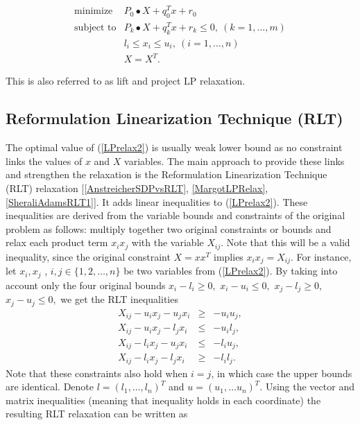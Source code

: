 \documentclass[12pt]{book}
\theoremstyle{definition}
\begin{document}
\begin{equation}
\label{LPrelax2} 
\begin{array}{ll}
\mbox{minimize}& P_0\bullet X + q_0^Tx + r_0\\
\mbox{subject to}& P_k\bullet X+ q_k^Tx + r_k \leq 0, \  (k = 1,\dots ,m)\\
 				& l_i\leq x_i \leq u_i, \ (i = 1,\dots ,n)\\
& X = X^T.
\end{array} 
\end{equation}

This is also referred to as lift and project LP relaxation. 

\subsection{Reformulation Linearization Technique (RLT)}
\label{SectionRLTinLP}

The optimal value of (\ref{LPrelax2}) is usually weak lower bound as no constraint links the values of $x$ and $X$ variables.
The main approach to provide these links and strengthen the relaxation is the Reformulation Linearization Technique (RLT) relaxation [\ref{AnstreicherSDPvsRLT}, \ref{MargotLPRelax}, \ref{SheraliAdamsRLT1}].
It adds linear inequalities to (\ref{LPrelax2}). These inequalities are derived from the variable bounds and 
constraints of the original problem as follows: multiply together two original constraints or bounds and relax 
each product term $x_ix_j$ with the variable $X_{ij}$. Note that this will be a valid inequality, since the original constraint $X=xx^T$ implies $x_ix_j = X_{ij}$. For instance, let $x_i, x_j$ , $i,j\in \{1, 2,\dots ,n\}$ be two variables from
(\ref{LPrelax2}). By taking into account only the four original bounds $x_i - l_i \geq 0,$ $x_i - u_i \leq 0 ,$ $ x_j - l_j \geq 0,$  $ x_j - u_j \leq 0,$ we get the RLT inequalities
\begin{equation}
\label{RLTConstraints}
\begin{array}{lcl}
X_{ij} - u_ix_j - u_jx_i  &\geq & -u_iu_j ,\\
X_{ij} - u_ix_j - l_jx_i  &\leq & -u_il_j ,\\
X_{ij} - l_ix_j - u_jx_i  &\leq & -l_iu_j ,\\
X_{ij} - l_ix_j - l_jx_i   &\geq & -l_il_j .
\end{array}
\end{equation}
 Note that these constraints also hold when $i = j$, in which case the upper bounds are identical. Denote $l = (l_1,\dots ,l_n)^T$ and $u = (u_1,\dots u_n)^T.$
 Using the vector and matrix inequalities (meaning that inequality holds in each coordinate) the resulting RLT relaxation can be written as 
 
\end{document}
